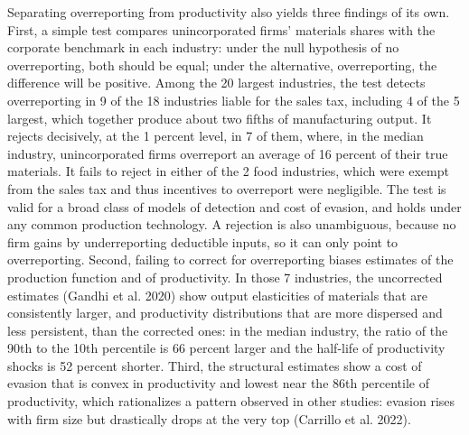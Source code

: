 \documentclass[
  12pt]{article}
\begin{document}
Separating overreporting from productivity also yields three findings of
its own. First, a simple test compares unincorporated firms' materials
shares with the corporate benchmark in each industry: under the null
hypothesis of no overreporting, both should be equal; under the
alternative, overreporting, the difference will be positive. Among the
20 largest industries, the test detects overreporting in 9 of the 18
industries liable for the sales tax, including 4 of the 5 largest, which
together produce about two fifths of manufacturing output. It rejects
decisively, at the 1 percent level, in 7 of them, where, in the median
industry, unincorporated firms overreport an average of 16 percent of
their true materials. It fails to reject in either of the 2 food
industries, which were exempt from the sales tax and thus incentives to
overreport were negligible. The test is valid for a broad class of
models of detection and cost of evasion, and holds under any common
production technology. A rejection is also unambiguous, because no firm
gains by underreporting deductible inputs, so it can only point to
overreporting. Second, failing to correct for overreporting biases
estimates of the production function and of productivity. In those 7
industries, the uncorrected estimates (Gandhi et al. 2020) show output
elasticities of materials that are consistently larger, and productivity
distributions that are more dispersed and less persistent, than the
corrected ones: in the median industry, the ratio of the 90th to the
10th percentile is 66 percent larger and the half-life of productivity
shocks is 52 percent shorter. Third, the structural estimates show a
cost of evasion that is convex in productivity and lowest near the 86th
percentile of productivity, which rationalizes a pattern observed in
other studies: evasion rises with firm size but drastically drops at the
very top (Carrillo et al. 2022).
\end{document}
